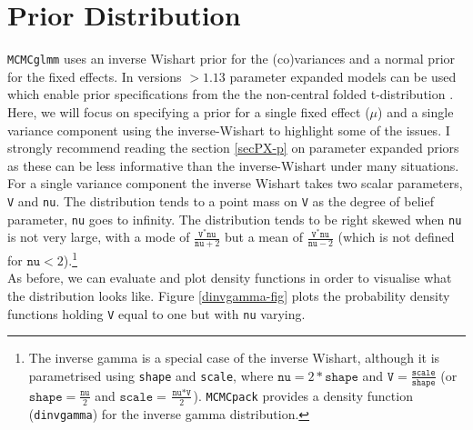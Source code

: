 \documentclass{article}
\begin{document}
\newpage
\section{Prior Distribution}

\texttt{MCMCglmm} uses an inverse Wishart prior for the (co)variances and a normal prior for the fixed effects. In versions $>1.13$ parameter expanded models can be used which enable prior specifications from the the non-central folded t-distribution \citep{Gelman.2006}. Here, we will focus on specifying a prior for a single fixed effect ($\mu$) and a single variance component using the inverse-Wishart to highlight some of the issues. I strongly recommend reading the section \ref{secPX-p} on parameter expanded priors as these can be less informative than the inverse-Wishart under many situations.\\

For a single variance component the inverse Wishart takes two scalar parameters, \texttt{V} and \texttt{nu}. The distribution tends to a point mass on \texttt{V} as the degree of belief parameter, \texttt{nu} goes to infinity. The distribution tends to be right skewed when \texttt{nu} is not very large, with a mode of $\frac{\texttt{V}^{\ast}\texttt{nu}}{\texttt{nu}+2}$ but a mean of $\frac{\texttt{V}^{\ast}\texttt{nu}}{\texttt{nu}-2}$ (which is not defined for $\texttt{nu}<2$).\footnote{The inverse gamma is a special case of the inverse Wishart, although it is parametrised using \texttt{shape} and \texttt{scale}, where $\texttt{nu}=2\ast\texttt{shape}$ and $\texttt{V} = \frac{\texttt{scale}}{\texttt{shape}}$ (or $\texttt{shape} = \frac{\texttt{nu}}{2}$ and $\texttt{scale} = \frac{\texttt{nu}*\texttt{V}}{2}$). \texttt{MCMCpack} provides a density function (\texttt{dinvgamma}) for the inverse gamma distribution.}\\

As before, we can evaluate and plot density functions in order to visualise what the distribution looks like. Figure \ref{dinvgamma-fig} plots the probability density functions holding \texttt{V} equal to one but with \texttt{nu} varying.\\

\iftalk
\else
\fi

\iftalk
\else
\fi
\end{document}
